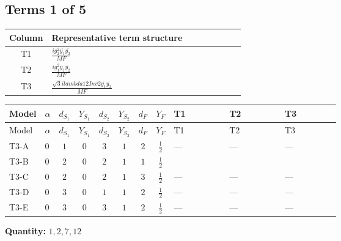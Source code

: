 \documentclass[8pt]{article}
\begin{document}
\begin{landscape}
\subsection*{Terms 1 of 5}
\begin{center}
\begin{tabular}{@{}c >{\raggedright\arraybackslash}p{0.82\linewidth}@{}}
\toprule
Column & Representative term structure \\
\midrule
T1 & \(\displaystyle \frac{i g_{2}^{2} \overline{y_{1}} \overline{y_{2}}}{MF}\) \\
\midrule
T2 & \(\displaystyle \frac{i g_{1}^{2} \overline{y_{1}} \overline{y_{2}}}{MF}\) \\
\midrule
T3 & \(\displaystyle \frac{\sqrt{3} i lambda12Inv2 \overline{y_{1}} \overline{y_{2}}}{MF}\) \\
\midrule
\bottomrule
\end{tabular}
\end{center}
\smallskip
\tiny
\begin{longtable}{@{}llcccccc >{\raggedright\arraybackslash}p{0.21\linewidth} >{\raggedright\arraybackslash}p{0.21\linewidth} >{\raggedright\arraybackslash}p{0.21\linewidth}@{}}
\toprule
Model & $\alpha$ & $d_{S_1}$ & $Y_{S_1}$ & $d_{S_2}$ & $Y_{S_2}$ & $d_F$ & $Y_F$ & T1 & T2 & T3 \\
\midrule
\endfirsthead
\toprule
Model & $\alpha$ & $d_{S_1}$ & $Y_{S_1}$ & $d_{S_2}$ & $Y_{S_2}$ & $d_F$ & $Y_F$ & T1 & T2 & T3 \\
\midrule
\endhead
T3-A & $0$ & $1$ & $0$ & $3$ & $1$ & $2$ & $\frac{1}{2}$ & --- & --- & --- \\
\midrule
T3-B & $0$ & $2$ & $0$ & $2$ & $1$ & $1$ & $\frac{1}{2}$ & \scriptsize\adjustbox{max width=\linewidth}{$\begin{gathered} - \frac{3 i g_{2}^{2} \overline{y_{1}} \overline{y_{2}}}{8 MF}\end{gathered}$} & \scriptsize\adjustbox{max width=\linewidth}{$\begin{gathered} - \frac{3 i g_{1}^{2} \overline{y_{1}} \overline{y_{2}}}{16 MF}\end{gathered}$} & \scriptsize\adjustbox{max width=\linewidth}{$\begin{gathered} - \frac{\sqrt{3} i lambda12Inv2 \overline{y_{1}} \overline{y_{2}}}{6 MF}\end{gathered}$} \\
\midrule
T3-C & $0$ & $2$ & $0$ & $2$ & $1$ & $3$ & $\frac{1}{2}$ & --- & --- & --- \\
\midrule
T3-D & $0$ & $3$ & $0$ & $1$ & $1$ & $2$ & $\frac{1}{2}$ & --- & --- & --- \\
\midrule
T3-E & $0$ & $3$ & $0$ & $3$ & $1$ & $2$ & $\frac{1}{2}$ & --- & --- & --- \\
\midrule
\bottomrule
\end{longtable}
\clearpage
\noindent\textbf{Quantity: }$\mathrm{1,2,7,12}$\par\smallskip

\end{landscape}
\end{document}
